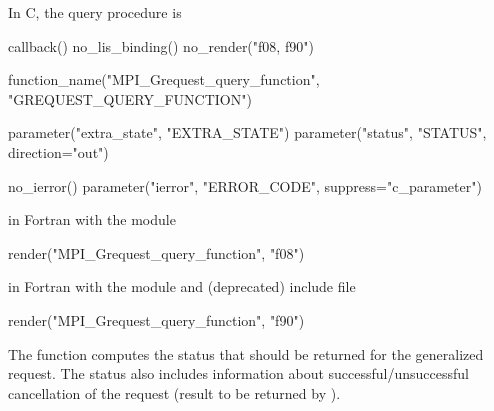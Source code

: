 In 
C, the query procedure is

%
\begin{mpi-binding}
    callback()
    no_lis_binding()
    no_render("f08, f90")
    
    function_name("MPI_Grequest_query_function", "GREQUEST_QUERY_FUNCTION")
    
    parameter("extra_state", "EXTRA_STATE")
    parameter("status", "STATUS", direction="out")
    
    no_ierror()
    parameter("ierror", "ERROR_CODE", suppress="c_parameter")
\end{mpi-binding}

\par\noindent
in Fortran with the  module

\begin{mpi-binding}
    render("MPI_Grequest_query_function", "f08")
\end{mpi-binding}

\par\noindent
in Fortran with the  module and (deprecated)  include file

\begin{mpi-binding}
    render("MPI_Grequest_query_function", "f90")
\end{mpi-binding}

\par\noindent

The  function computes the status
that should be returned for the generalized request.
The status
also includes information about successful/unsuccessful cancellation of
the request (result to be returned by ).


